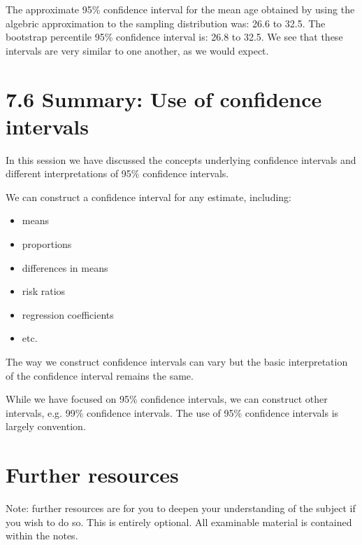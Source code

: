 \documentclass[letterpaper,10pt,english]{jupyterBook}
\begin{document}
\sphinxAtStartPar
The approximate 95\% confidence interval for the mean age obtained by using the algebric approximation to the sampling distribution was: 26.6 to 32.5. The bootstrap percentile 95\% confidence interval is: 26.8 to 32.5. We see that these intervals are very similar to one another, as we would expect.


\section{7.6 Summary: Use of confidence intervals}
\label{\detokenize{07.g. Frequentist I:summary-use-of-confidence-intervals}}\label{\detokenize{07.g. Frequentist I::doc}}
\sphinxAtStartPar
In this session we have discussed the concepts underlying confidence intervals and different interpretations of 95\% confidence intervals.

\sphinxAtStartPar
We can construct a confidence interval for any estimate, including:
\begin{itemize}
\item {} 
\sphinxAtStartPar
means

\item {} 
\sphinxAtStartPar
proportions

\item {} 
\sphinxAtStartPar
differences in means

\item {} 
\sphinxAtStartPar
risk ratios

\item {} 
\sphinxAtStartPar
regression coefficients

\item {} 
\sphinxAtStartPar
etc.

\end{itemize}

\sphinxAtStartPar
The way we construct confidence intervals can vary but the basic interpretation of the confidence interval remains the same.

\sphinxAtStartPar
While we have focused on 95\% confidence intervals, we can construct other intervals, e.g. 99\% confidence intervals. The use of 95\% confidence intervals is largely convention.


\section{Further resources}
\label{\detokenize{07.h. Frequentist I:further-resources}}\label{\detokenize{07.h. Frequentist I::doc}}
\sphinxAtStartPar
Note: further resources are for you to deepen your understanding of the subject if you wish to do so. This is entirely optional. All examinable material is contained within the notes.
\end{document}
